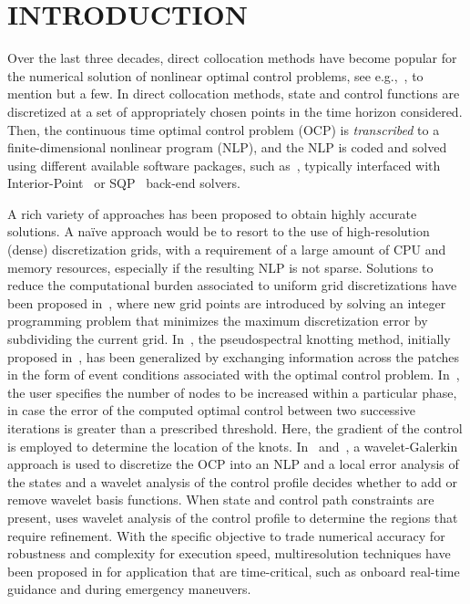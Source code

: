 \section*{INTRODUCTION}

Over the last three decades, direct collocation methods have become popular for the numerical solution of nonlinear optimal control problems, see e.g.,~\cite{Fahroo:JGCD:2002,Elnager:TAC:1995,Fahroo:JAS:2000,Gong:AAS:2006}, to mention but a few. In direct collocation methods, state and control functions are discretized at a set of appropriately chosen points in the time horizon considered. Then, the continuous time optimal control problem (OCP) is \emph{transcribed} to a finite-dimensional nonlinear program (NLP), and the NLP is coded and solved using different available software packages, such as~\cite{casadi:MPC:2019, Rao:TMS:2010,GPOPSII:TMS:2013}, typically interfaced with Interior-Point~\cite{Biegler:CCE:2009} or SQP~\cite{SNOPT:SIAMReview:2005} back-end solvers.

A rich variety of approaches has been proposed to obtain highly accurate solutions. A na\"{i}ve approach would be to resort to the use of high-resolution (dense) discretization grids, with a requirement of a large amount of CPU and memory resources, especially if the resulting NLP is not sparse. Solutions to reduce the computational burden associated to uniform grid discretizations have been proposed in~\cite{Betts:JCAM:2000}, where new grid points are introduced by solving an integer programming problem that minimizes the
maximum discretization error by subdividing the current grid. In~\cite{Ross:AAS:2003}, the pseudospectral knotting method, initially proposed in~\cite{Fahroo:ASC:2000}, has been generalized by exchanging information across the patches in the form of event conditions associated with the optimal control problem. In~\cite{Gong:AAS:2006}, the user specifies the number of nodes to be increased within a particular phase, in case the error of the computed optimal control between two successive iterations is
greater than a prescribed threshold. Here, the
gradient of the control is employed to determine the location of
the knots. In~\cite{Binder:CCE:2000} and~\cite{Binder:TechRep:2000}, a wavelet-Galerkin approach is used to discretize the OCP into an NLP and a local error analysis of the states and a wavelet analysis of the
control profile decides whether to add or remove wavelet basis functions. When state and control path constraints are present, \cite{Schlegel:CCE:2005}  uses wavelet analysis of the control profile to determine the
regions that require refinement.
With the specific objective to trade numerical accuracy for robustness and complexity for execution speed, multiresolution techniques have been proposed in \cite{Jain:CDC:2007,Jain:JGCD:2008} for application that are time-critical, such as onboard real-time guidance and during emergency maneuvers.

